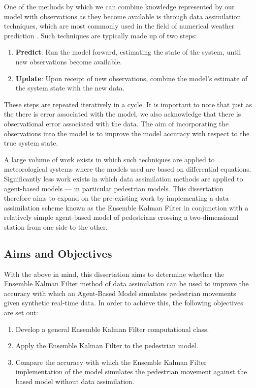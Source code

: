 One of the methods by which we can combine knowledge represented by our model
with observations as they become available is through data assimilation
techniques, which are most commonly used in the field of numerical weather
prediction \citep{kalnay2003atmospheric}.
Such techniques are typically made up of two steps:
\begin{enumerate}
    \item \textbf{Predict}: Run the model forward, estimating the state of the system,
    until new observations become available.
    \item \textbf{Update}: Upon receipt of new observations, combine the model's estimate
    of the system state with the new data.
\end{enumerate}
These steps are repeated iteratively in a cycle.
It is important to note that just as the there is error associated with the
model, we also acknowledge that there is observational error associated with the
data.
The aim of incorporating the observations into the model is to improve the model
accuracy with respect to the true system state.

A large volume of work exists in which such techniques are applied to
meteorological systems where the models used are based on differential
equations.
Significantly less work exists in which data assimilation methods are applied to
agent-based models --- in particular pedestrian models.
This dissertation therefore aims to expand on the pre-existing work by
implementing a data assimilation scheme known as the Ensemble Kalman Filter in
conjunction with a relatively simple agent-based model of pedestrians crossing a
two-dimensional station from one side to the other.

\subsection{Aims and Objectives}\label{sub:intro:aims}

With the above in mind, this dissertation aims to determine whether the Ensemble
Kalman Filter method of data assimilation can be used to improve the accuracy
with which an Agent-Based Model simulates pedestrian movements given synthetic
real-time data.
In order to achieve this, the following objectives are set out:
\begin{enumerate}
    \item Develop a general Ensemble Kalman Filter computational class.
    \item Apply the Ensemble Kalman Filter to the pedestrian model.
    \item Compare the accuracy with which the Ensemble Kalman Filter
        implementation of the model simulates the pedestrian movement against
        the based model without data assimilation.
\end{enumerate}

